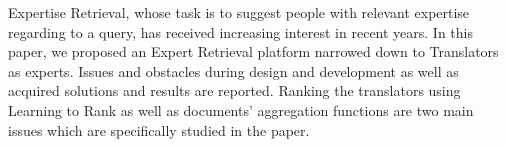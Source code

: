 Expertise Retrieval, whose task is to suggest people with relevant expertise regarding to a query, has received increasing interest in recent years. In this paper, we proposed an Expert Retrieval platform narrowed down to Translators as experts. Issues and obstacles during design and development as well as acquired solutions and results are reported. Ranking the translators using Learning to Rank as well as documents' aggregation functions are two main issues which are specifically studied in the paper.